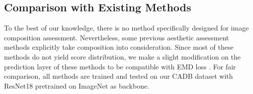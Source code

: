 \documentclass{bmvc2k}
\begin{document}
\subsection{Comparison with Existing Methods}
\begin{table}
    \begin{center}
    \end{center}
    \caption{Comparison of different methods on the composition assessment task. All models are trained and evaluated on the proposed CADB dataset.}
    \label{table_baseline}
    \vspace{-4mm}
\end{table}
To the best of our knowledge, there is no method specifically designed for image composition assessment. Nevertheless, some previous aesthetic assessment methods \cite{Kong2016PhotoAR,Mai2016CompositionPreservingDP,Ma2017ALampAL,Wang2019ModelingHP, Liu2020CompositionAwareIA, Chen2020AdaptiveFD} explicitly take composition into consideration. Since most of these methods do not yield score distribution, we make a slight modification on the prediction layer of these methods to be compatible with EMD loss \cite{Hou2016SquaredEM}. For fair comparison, all methods are trained and tested on our CADB dataset with ResNet18 pretrained on ImageNet \cite{deng2009imagenet} as backbone.
\end{document}

